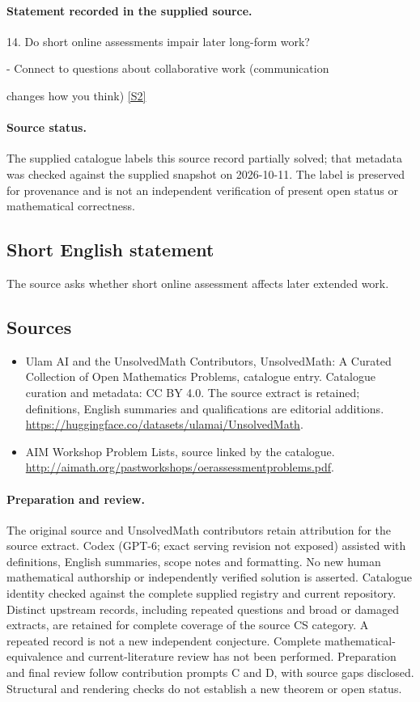 \documentclass[11pt]{article}
\begin{document}
\paragraph{Statement recorded in the supplied source.}
14. Do short online assessments impair later long-form work?

- Connect to questions about collaborative work (communication

changes how you think) \href{http://aimath.org/pastworkshops/oerassessmentproblems.pdf}{[S2]}
\paragraph{Source status.}
The supplied catalogue labels this source record partially solved; that metadata was checked against the supplied snapshot on 2026-10-11. The label is preserved for provenance and is not an independent verification of present open status or mathematical correctness.
\subsection{Short English statement}
The source asks whether short online assessment affects later extended work.
\subsection{Sources}
\begin{itemize}
\item[S1] Ulam AI and the UnsolvedMath Contributors, UnsolvedMath: A Curated Collection of Open Mathematics Problems, catalogue entry. Catalogue curation and metadata: CC BY 4.0. The source extract is retained; definitions, English summaries and qualifications are editorial additions.
\url{https://huggingface.co/datasets/ulamai/UnsolvedMath}.
\item[S2] AIM Workshop Problem Lists, source linked by the catalogue.
\url{http://aimath.org/pastworkshops/oerassessmentproblems.pdf}.
\end{itemize}
\paragraph{Preparation and review.}
The original source and UnsolvedMath contributors retain attribution for the source extract. Codex (GPT-6; exact serving revision not exposed) assisted with definitions, English summaries, scope notes and formatting. No new human mathematical authorship or independently verified solution is asserted. Catalogue identity checked against the complete supplied registry and current repository. Distinct upstream records, including repeated questions and broad or damaged extracts, are retained for complete coverage of the source CS category. A repeated record is not a new independent conjecture. Complete mathematical-equivalence and current-literature review has not been performed. Preparation and final review follow contribution prompts C and D, with source gaps disclosed. Structural and rendering checks do not establish a new theorem or open status.
\label{end:statement}
\end{document}
